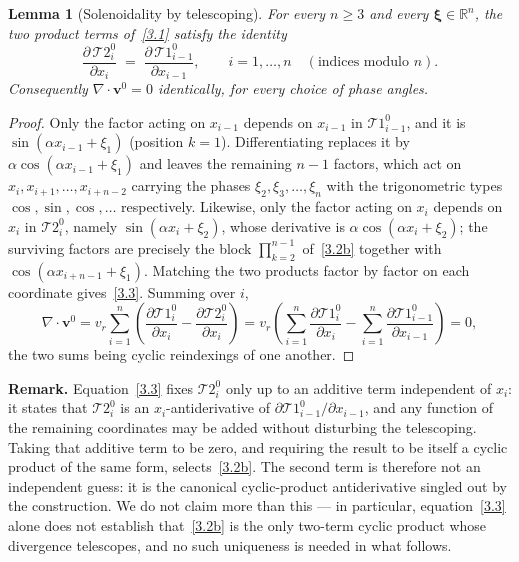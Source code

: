 \documentclass[11pt]{jfm}
\let\ge=\geqslant  \let\geq=\geqslant
\newtheorem{lemma}{Lemma}[section]
\numberwithin{equation}{section}
\begin{document}
\begin{lemma}[Solenoidality by telescoping]
\label{lem:solenoidal}
For every $n\ge 3$ and every $\boldsymbol{\xi}\in\mathbb{R}^n$, the two product terms
of~\eqref{3.1} satisfy the identity
\begin{equation}
\label{3.3}
\frac{\partial\, \mathcal{T}2_i^0}{\partial x_i}
\;=\;
\frac{\partial\, \mathcal{T}1_{i-1}^0}{\partial x_{i-1}},
\qquad i = 1,\dots,n \quad (\text{indices modulo } n).
\end{equation}
Consequently $\nabla\cdot\boldsymbol{v}^0 = 0$ identically, for every choice of phase angles.
\end{lemma}

\begin{proof}
Only the factor acting on $x_{i-1}$ depends on $x_{i-1}$ in $\mathcal{T}1_{i-1}^0$, and it is
$\sin(\alpha x_{i-1}+\xi_1)$ (position $k=1$). Differentiating replaces it by
$\alpha\cos(\alpha x_{i-1}+\xi_1)$ and leaves the remaining $n-1$ factors, which act on
$x_i, x_{i+1},\dots,x_{i+n-2}$ carrying the phases $\xi_2,\xi_3,\dots,\xi_n$ with the
trigonometric types $\cos,\sin,\cos,\dots$ respectively. Likewise, only the factor acting on
$x_i$ depends on $x_i$ in $\mathcal{T}2_i^0$, namely $\sin(\alpha x_i+\xi_2)$, whose derivative is
$\alpha\cos(\alpha x_i+\xi_2)$; the surviving factors are precisely the block
$\prod_{k=2}^{n-1}$ of~\eqref{3.2b} together with $\cos(\alpha x_{i+n-1}+\xi_1)$. Matching the
two products factor by factor on each coordinate gives~\eqref{3.3}. Summing over $i$,
\begin{equation}
\label{3.4}
\nabla\cdot\boldsymbol{v}^0
= v_r\sum_{i=1}^{n}\left(\frac{\partial \mathcal{T}1_i^0}{\partial x_i}-\frac{\partial \mathcal{T}2_i^0}{\partial x_i}\right)
= v_r\left(\sum_{i=1}^{n}\frac{\partial \mathcal{T}1_i^0}{\partial x_i}
- \sum_{i=1}^{n}\frac{\partial \mathcal{T}1_{i-1}^0}{\partial x_{i-1}}\right) = 0,
\end{equation}
the two sums being cyclic reindexings of one another.
\end{proof}

\noindent\textbf{Remark.} Equation~\eqref{3.3} fixes $\mathcal{T}2_i^0$ only up to an additive term
independent of $x_i$: it states that $\mathcal{T}2_i^0$ is an $x_i$-antiderivative of
$\partial \mathcal{T}1_{i-1}^0/\partial x_{i-1}$, and any function of the remaining coordinates may be
added without disturbing the telescoping. Taking that additive term to be zero, and requiring
the result to be itself a cyclic product of the same form, selects~\eqref{3.2b}. The second term
is therefore not an independent guess: it is the canonical cyclic-product antiderivative
singled out by the construction. We do not claim more than this --- in particular,
equation~\eqref{3.3} alone does not establish that~\eqref{3.2b} is the only two-term cyclic
product whose divergence telescopes, and no such uniqueness is needed in what follows.
\end{document}
